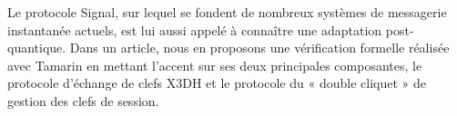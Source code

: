 {%



Le protocole Signal, sur lequel se fondent de nombreux systèmes de messagerie instantanée actuels, est lui aussi appelé à connaître une adaptation post-quantique. Dans un article, nous en proposons une vérification formelle réalisée avec Tamarin en mettant l’accent sur ses deux principales composantes, le protocole d’échange de clefs X3DH et le protocole du « double cliquet » de gestion des clefs de session.\par









}

